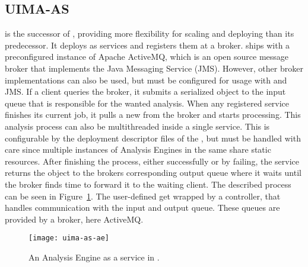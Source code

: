 \subsection{UIMA-AS}
\label{ssec:uimaas}
\uimaas{} is the successor of \uimacpe{}, providing more flexibility for scaling and deploying than its predecessor. It deploys \anens{} as services and registers them at a broker. \uimaas{} ships with a preconfigured instance of Apache ActiveMQ, which is an open source message broker that implements the Java Messaging Service (JMS). However, other broker implementations can also be used, but must be configured for usage with \uimaas{} and JMS. If a \uimaas{} client queries the broker, it submits a serialized \cas{} object to the input queue that is responsible for the wanted analysis. When any registered service finishes its current job, it pulls a new \cas{} from the broker and starts processing. This analysis process can also be multithreaded inside a single service. This is configurable by the deployment \xml{} descriptor files of the \anens{}, but must be handled with care since multiple instances of Analysis Engines in the same \jvm{} share static resources. After finishing the process, either successfully or by failing, the service returns the \cas{} object to the brokers corresponding output queue where it waits until the broker finds time to forward it to the waiting client. The described process can be seen in Figure~\ref{fig:uimaas-ae}. The user-defined \anen{} get wrapped by a \uimaas{} controller, that handles communication with the input and output queue. These queues are provided by a broker, here ActiveMQ.

\begin{figure}[hbt]
	\centering
	\texttt{[image: uima-as-ae]}
	\caption[An Analysis Engine as a service in UIMA-AS.]{An Analysis Engine as a service in \uimaas{} \cite{uimaas:documentation}.}
	\label{fig:uimaas-ae}
\end{figure}

